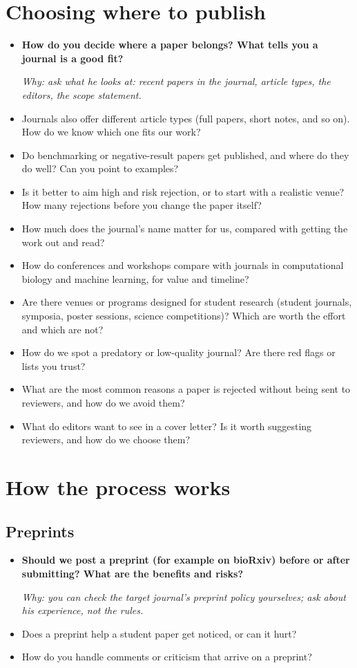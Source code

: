 \documentclass[10.5pt]{article}
\newcommand{\Q}[1]{\item[$\square$] #1}
\newcommand{\QS}[1]{\item[\textbf{$\star$}] \textbf{#1}}
\newcommand{\why}[1]{\par{\small\itshape\color{note}Why: #1}}
\begin{document}
\section{Choosing where to publish}
\begin{itemize}
\QS{How do you decide where a paper belongs? What tells you a journal is a good fit?}
\why{ask what he looks at: recent papers in the journal, article types, the editors, the scope statement.}
\Q{Journals also offer different article types (full papers, short notes, and so on). How do we know which one fits our work?}
\Q{Do benchmarking or negative-result papers get published, and where do they do well? Can you point to examples?}
\Q{Is it better to aim high and risk rejection, or to start with a realistic venue? How many rejections before you change the paper itself?}
\Q{How much does the journal's name matter for us, compared with getting the work out and read?}
\Q{How do conferences and workshops compare with journals in computational biology and machine learning, for value and timeline?}
\Q{Are there venues or programs designed for student research (student journals, symposia, poster sessions, science competitions)? Which are worth the effort and which are not?}
\Q{How do we spot a predatory or low-quality journal? Are there red flags or lists you trust?}
\Q{What are the most common reasons a paper is rejected without being sent to reviewers, and how do we avoid them?}
\Q{What do editors want to see in a cover letter? Is it worth suggesting reviewers, and how do we choose them?}
\end{itemize}

\section{How the process works}
\subsection*{Preprints}
\begin{itemize}
\QS{Should we post a preprint (for example on bioRxiv) before or after submitting? What are the benefits and risks?}
\why{you can check the target journal's preprint policy yourselves; ask about his experience, not the rules.}
\Q{Does a preprint help a student paper get noticed, or can it hurt?}
\Q{How do you handle comments or criticism that arrive on a preprint?}
\end{itemize}
\end{document}
